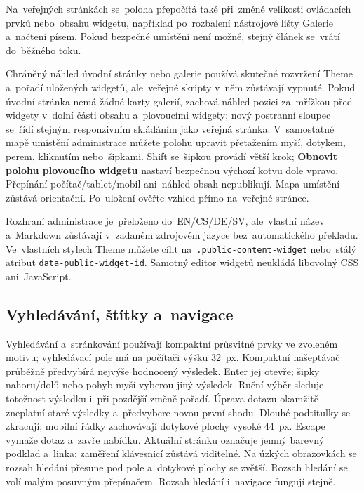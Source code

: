 \documentclass[11pt,a4paper]{article}
\newcommand{\ui}[1]{\textbf{#1}}
\begin{document}
Na~veřejných stránkách se~poloha přepočítá také při~změně velikosti ovládacích
prvků nebo~obsahu widgetu, například po~rozbalení nástrojové lišty Galerie
a~načtení písem. Pokud bezpečné umístění není možné, stejný článek se~vrátí
do~běžného toku.

Chráněný náhled úvodní stránky nebo galerie používá skutečné rozvržení Theme
a~pořadí uložených widgetů, ale~veřejné skripty v~něm zůstávají vypnuté. Pokud
úvodní stránka nemá žádné karty galerií, zachová náhled pozici za~mřížkou před
widgety v~dolní části obsahu a~plovoucími widgety; nový postranní sloupec
se~řídí stejným responzivním skládáním jako veřejná stránka. V~samostatné mapě
umístění administrace můžete polohu upravit přetažením myší, dotykem, perem,
kliknutím nebo~šipkami. Shift se~šipkou provádí větší krok; \ui{Obnovit polohu
plovoucího widgetu} nastaví bezpečnou výchozí kotvu dole vpravo. Přepínání
počítač/tablet/mobil ani~náhled obsah nepublikují. Mapa umístění zůstává
orientační. Po~uložení ověřte vzhled přímo na~veřejné stránce.

Rozhraní administrace je~přeloženo do~EN/CS/DE/SV, ale~vlastní název a~Markdown
zůstávají v~zadaném zdrojovém jazyce bez~automatického překladu. Ve~vlastních
stylech Theme můžete cílit na~\texttt{.public-content-widget} nebo~stálý atribut
\texttt{data-public-widget-id}. Samotný editor widgetů neukládá libovolný CSS
ani~JavaScript.


\subsection{Vyhledávání, štítky a~navigace}

Vyhledávání a~stránkování používají kompaktní průsvitné prvky ve zvoleném
motivu; vyhledávací pole má na počítači výšku 32~px.
Kompaktní našeptávač průběžně předvybírá nejvýše hodnocený výsledek.
Enter jej otevře; šipky nahoru/dolů nebo pohyb myší vyberou jiný výsledek.
Ruční výběr sleduje totožnost výsledku i~při pozdější změně pořadí.
Úprava dotazu okamžitě zneplatní staré výsledky a~předvybere novou první
shodu. Dlouhé podtitulky se zkracují; mobilní řádky zachovávají dotykové
plochy vysoké 44~px. Escape vymaže dotaz a~zavře nabídku.
Aktuální stránku označuje jemný barevný podklad a~linka; zaměření
klávesnicí zůstává viditelné. Na úzkých obrazovkách se rozsah hledání přesune
pod pole a~dotykové plochy se zvětší. Rozsah hledání se volí malým posuvným
přepínačem. Rozsah hledání i~navigace fungují stejně.
\end{document}
